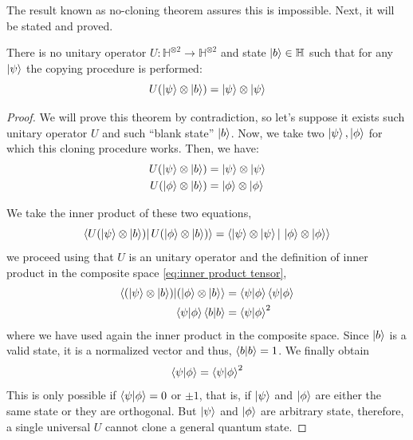 The result known as no-cloning theorem assures this is impossible. Next, it will be stated and proved.

\begin{teorema}
    There is no unitary operator $ U: \mathbb{H}^{\otimes 2} \longrightarrow \mathbb{H}^{\otimes 2}$ and state $\ket{b}\in \mathbb{H}$ such that for any $\ket{\psi}$ the copying procedure is performed:
    $$U(\ket{\psi}\otimes \ket{b})=\ket{\psi}\otimes \ket{\psi}$$
\end{teorema}
\begin{proof}
    We will prove this theorem by contradiction, so let's suppose it exists such unitary operator $U$ and such ``blank state'' $\ket{b}$. Now, we take two $\ket{\psi}, \ket{\phi}$ for which this cloning procedure works. Then, we have:
    \begin{align}
        U(\ket{\psi}\otimes \ket{b}) &=\ket{\psi}\otimes \ket{\psi} \\
        U(\ket{\phi}\otimes \ket{b}) &=\ket{\phi}\otimes \ket{\phi}
    \end{align}

    We take the inner product of these two equations,
    \begin{equation}
        \braket{U(\ket{\psi}\otimes \ket{b}) | \, U(\ket{\phi}\otimes \ket{b})} = \braket{\ket{\psi}\otimes \ket{\psi}| \, \ket{\phi}\otimes \ket{\phi}}
    \end{equation}
    we proceed using that $U$ is an unitary operator and the definition of inner product in the composite space \autoref{eq:inner product tensor},
    \begin{align}
        \braket{(\ket{\psi}\otimes \ket{b})|(\ket{\phi} \otimes \ket{b}} &= \braket{\psi | \phi} \braket{\psi | \phi} \\
        \braket{\psi |\phi} \braket{b|b} &= \braket{\psi | \phi}^2
    \end{align}
    where we have used again the inner product in the composite space. Since $\ket{b}$ is a valid state, it is a normalized vector and thus, $\braket{b |b} = 1$. We finally obtain
    \begin{equation}
        \braket{\psi |\phi} = \braket{\psi | \phi}^2
    \end{equation}
    This is only possible if $\braket{\psi |\phi} = 0$ or $\pm 1$, that is, if $\ket{\psi}$ and $\ket{\phi}$ are either the same state or they are orthogonal. But $\ket{\psi}$ and $\ket{\phi}$ are arbitrary state, therefore, a single universal $U$ cannot clone a general quantum state. 
\end{proof}

